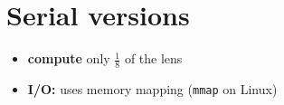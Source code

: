 \documentclass[12pt]{article}
\newcommand*{\openquote}{\tikz[remember picture,overlay,xshift=-15pt,yshift=-10pt]
\node (OQ) {\quotefont\fontsize{60}{60}\selectfont``};\kern0pt}
\newcommand*{\closequote}{\tikz[remember picture,overlay,xshift=15pt,yshift=10pt]
\node (CQ) {\quotefont\fontsize{60}{60}\selectfont''};}
\newenvironment{shadequote}%
{\begin{snugshade}\begin{quote}\openquote}
{\hfill\closequote\end{quote}\end{snugshade}}
\begin{document}

\section{Serial versions}

\begin{itemize}
    \item \textbf{compute} only $\frac{1}{8}$ of the lens
    \item \textbf{I/O:} uses memory mapping (\texttt{mmap} on Linux)
\end{itemize}
\end{document}
